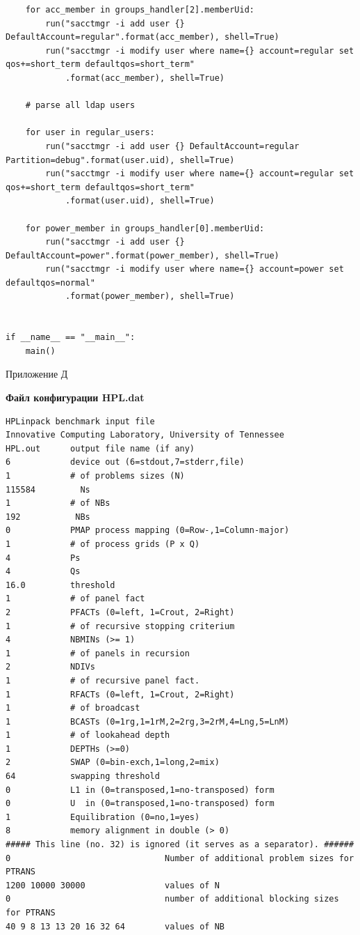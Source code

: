 \documentclass[a4paper]{extarticle}
\begin{document}
\begin{verbatim}
    for acc_member in groups_handler[2].memberUid:
        run("sacctmgr -i add user {} DefaultAccount=regular".format(acc_member), shell=True)
        run("sacctmgr -i modify user where name={} account=regular set qos+=short_term defaultqos=short_term"
            .format(acc_member), shell=True)

    # parse all ldap users

    for user in regular_users:
        run("sacctmgr -i add user {} DefaultAccount=regular Partition=debug".format(user.uid), shell=True)
        run("sacctmgr -i modify user where name={} account=regular set qos+=short_term defaultqos=short_term"
            .format(user.uid), shell=True)

    for power_member in groups_handler[0].memberUid:
        run("sacctmgr -i add user {} DefaultAccount=power".format(power_member), shell=True)
        run("sacctmgr -i modify user where name={} account=power set defaultqos=normal"
            .format(power_member), shell=True)


if __name__ == "__main__":
    main()
\end{verbatim}

\newpage

\begin{flushright}Приложение Д\end{flushright}
\centerline{\textbf{Файл конфигурации HPL.dat}}
\begin{verbatim}
HPLinpack benchmark input file
Innovative Computing Laboratory, University of Tennessee
HPL.out      output file name (if any) 
6            device out (6=stdout,7=stderr,file)
1            # of problems sizes (N)
115584         Ns
1            # of NBs
192           NBs
0            PMAP process mapping (0=Row-,1=Column-major)
1            # of process grids (P x Q)
4            Ps
4            Qs
16.0         threshold
1            # of panel fact
2            PFACTs (0=left, 1=Crout, 2=Right)
1            # of recursive stopping criterium
4            NBMINs (>= 1)
1            # of panels in recursion
2            NDIVs
1            # of recursive panel fact.
1            RFACTs (0=left, 1=Crout, 2=Right)
1            # of broadcast
1            BCASTs (0=1rg,1=1rM,2=2rg,3=2rM,4=Lng,5=LnM)
1            # of lookahead depth
1            DEPTHs (>=0)
2            SWAP (0=bin-exch,1=long,2=mix)
64           swapping threshold
0            L1 in (0=transposed,1=no-transposed) form
0            U  in (0=transposed,1=no-transposed) form
1            Equilibration (0=no,1=yes)
8            memory alignment in double (> 0)
##### This line (no. 32) is ignored (it serves as a separator). ######
0                               Number of additional problem sizes for PTRANS
1200 10000 30000                values of N
0                               number of additional blocking sizes for PTRANS
40 9 8 13 13 20 16 32 64        values of NB
\end{verbatim}
\end{document}
